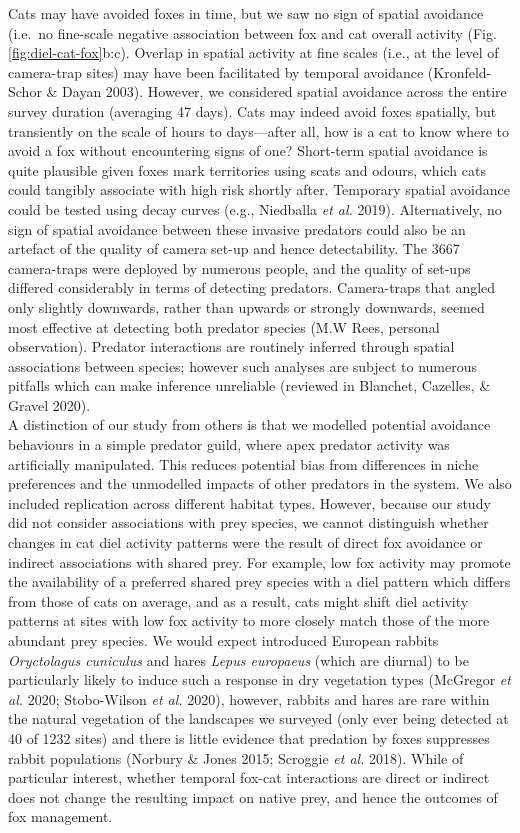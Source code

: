 \documentclass[]{elsarticle} %
\begin{document}
Cats may have avoided foxes in time, but we saw no sign of spatial avoidance (i.e.~no fine-scale negative association between fox and cat overall activity (Fig. \ref{fig:diel-cat-fox}b:c). Overlap in spatial activity at fine scales (i.e., at the level of camera-trap sites) may have been facilitated by temporal avoidance (Kronfeld-Schor \& Dayan 2003). However, we considered spatial avoidance across the entire survey duration (averaging 47 days). Cats may indeed avoid foxes spatially, but transiently on the scale of hours to days---after all, how is a cat to know where to avoid a fox without encountering signs of one? Short-term spatial avoidance is quite plausible given foxes mark territories using scats and odours, which cats could tangibly associate with high risk shortly after. Temporary spatial avoidance could be tested using decay curves (e.g., Niedballa \emph{et al.} 2019). Alternatively, no sign of spatial avoidance between these invasive predators could also be an artefact of the quality of camera set-up and hence detectability. The 3667 camera-traps were deployed by numerous people, and the quality of set-ups differed considerably in terms of detecting predators. Camera-traps that angled only slightly downwards, rather than upwards or strongly downwards, seemed most effective at detecting both predator species (M.W Rees, personal observation). Predator interactions are routinely inferred through spatial associations between species; however such analyses are subject to numerous pitfalls which can make inference unreliable (reviewed in Blanchet, Cazelles, \& Gravel 2020).\\
A distinction of our study from others is that we modelled potential avoidance behaviours in a simple predator guild, where apex predator activity was artificially manipulated. This reduces potential bias from differences in niche preferences and the unmodelled impacts of other predators in the system. We also included replication across different habitat types. However, because our study did not consider associations with prey species, we cannot distinguish whether changes in cat diel activity patterns were the result of direct fox avoidance or indirect associations with shared prey. For example, low fox activity may promote the availability of a preferred shared prey species with a diel pattern which differs from those of cats on average, and as a result, cats might shift diel activity patterns at sites with low fox activity to more closely match those of the more abundant prey species. We would expect introduced European rabbits \emph{Oryctolagus cuniculus} and hares \emph{Lepus europaeus} (which are diurnal) to be particularly likely to induce such a response in dry vegetation types (McGregor \emph{et al.} 2020; Stobo-Wilson \emph{et al.} 2020), however, rabbits and hares are rare within the natural vegetation of the landscapes we surveyed (only ever being detected at 40 of 1232 sites) and there is little evidence that predation by foxes suppresses rabbit populations (Norbury \& Jones 2015; Scroggie \emph{et al.} 2018). While of particular interest, whether temporal fox-cat interactions are direct or indirect does not change the resulting impact on native prey, and hence the outcomes of fox management.
\end{document}
